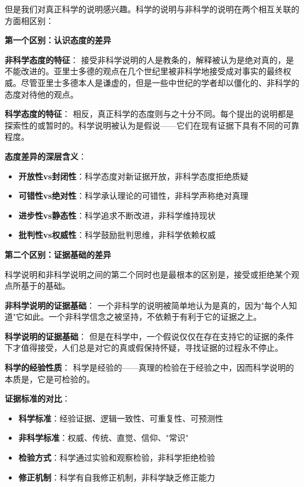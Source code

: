 但是我们对真正科学的说明感兴趣。科学的说明与非科学的说明在两个相互关联的方面相区别：

\begin{theorembox}[title=科学态度与非科学态度的根本区别]
\textbf{第一个区别：认识态度的差异}

\textbf{非科学态度的特征}：
接受非科学说明的人是教条的，解释被认为是绝对真的，是不能改进的。亚里士多德的观点在几个世纪里被非科学地接受成对事实的最终权威。尽管亚里士多德本人是谦虚的，但是一些中世纪的学者却以僵化的、非科学的态度对待他的观点。\cite{crombie1960}

\textbf{科学态度的特征}：
相反，真正科学的态度则与之十分不同。每个提出的说明都是探索性的或暂时的。科学说明被认为是假说——它们在现有证据下具有不同的可靠程度。

\textbf{态度差异的深层含义}：
\begin{itemize}
\item \textbf{开放性vs封闭性}：科学态度对新证据开放，非科学态度拒绝质疑
\item \textbf{可错性vs绝对性}：科学承认理论的可错性，非科学声称绝对真理
\item \textbf{进步性vs静态性}：科学追求不断改进，非科学维持现状
\item \textbf{批判性vs权威性}：科学鼓励批判思维，非科学依赖权威
\end{itemize}
\end{theorembox}

\begin{theorembox}[title=证据基础：科学与非科学的根本分野]
\textbf{第二个区别：证据基础的差异}

科学说明和非科学说明之间的第二个同时也是最根本的区别是，接受或拒绝某个观点所基于的基础。

\textbf{非科学说明的证据基础}：
一个非科学的说明被简单地认为是真的，因为"每个人知道"它如此。一个非科学信念之被坚持，不依赖于有利于它的证据之上。

\textbf{科学说明的证据基础}：
但是在科学中，一个假说仅仅在存在支持它的证据的条件下才值得接受，人们总是对它的真或假保持怀疑，寻找证据的过程永不停止。

\textbf{科学的经验性质}：
科学是经验的——真理的检验在于经验之中，因而科学说明的本质是，它是可检验的。

\textbf{证据标准的对比}：
\begin{itemize}
\item \textbf{科学标准}：经验证据、逻辑一致性、可重复性、可预测性
\item \textbf{非科学标准}：权威、传统、直觉、信仰、"常识"
\item \textbf{检验方式}：科学通过实验和观察检验，非科学拒绝检验
\item \textbf{修正机制}：科学有自我修正机制，非科学缺乏修正能力
\end{itemize}
\end{theorembox}

